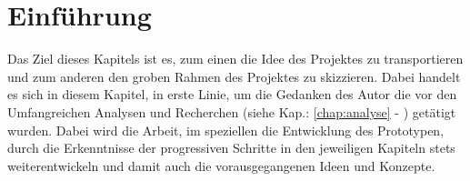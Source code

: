 \documentclass[Bachelorarbeit.tex]{subfiles}
\begin{document}
\chapter{Einführung}
\label{chap:einfuehrung}

Das Ziel dieses Kapitels ist es, zum einen die Idee des Projektes zu transportieren und zum anderen den groben Rahmen des Projektes zu skizzieren.
Dabei handelt es sich in diesem Kapitel, in erste Linie, um die Gedanken des Autor die vor den Umfangreichen Analysen und Recherchen (siehe Kap.: \ref{chap:analyse} - ) getätigt wurden.
Dabei wird die Arbeit, im speziellen die Entwicklung des Prototypen, durch die Erkenntnisse der progressiven Schritte in den jeweiligen Kapiteln stets weiterentwickeln und damit auch die vorausgegangenen Ideen und Konzepte.
\end{document}
